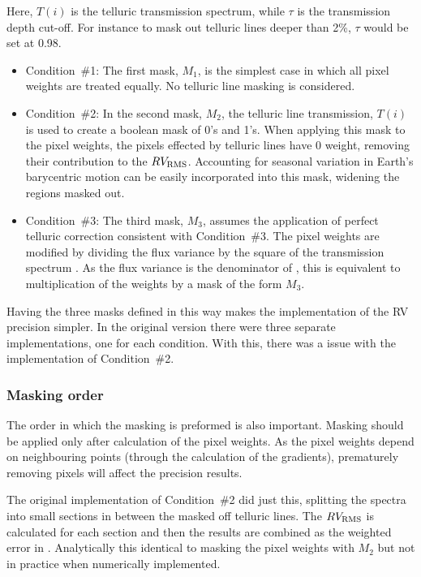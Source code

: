 Here, \(T(i)\) is the telluric transmission spectrum, while \(\tau\) is the transmission depth cut-off. For instance to mask out telluric lines deeper than 2\%,  \(\tau\) would be set at 0.98.

\begin{itemize}
    \item Condition~\#1:
    The first mask, \(M_1\), is the simplest case in which all pixel weights are treated equally. No telluric line masking is considered.

    \item Condition~\#2:
    In the second mask, \(M_2\), the telluric line transmission, \(T(i)\) is used to create a boolean mask of 0's and 1's. When applying this mask to the pixel weights, the pixels effected by telluric lines have 0 weight, removing their contribution to the {\red{} \(RV_{\textrm{RMS}}\)}. Accounting for seasonal variation in Earth's barycentric motion can be easily incorporated into this mask, widening the regions masked out.

    \item Condition~\#3:
    The third mask, \(M_3\), assumes the application of perfect telluric correction consistent with Condition~\#3. The pixel weights are modified by dividing the flux variance by the square of the transmission spectrum . As the flux variance is the denominator of , this is equivalent to multiplication of the weights by a mask of the form \(M_3\).
\end{itemize}

Having the three masks defined in this way makes the implementation of the {RV} precision simpler. In the original version there were three separate implementations, one for each condition. With this,  there was a issue with the implementation of Condition~\#2.

\subsubsection{Masking order}
\label{subsubsec:masking_order}
The order in which the masking is preformed is also important. Masking should be applied only after calculation of the pixel weights. As the pixel weights depend on neighbouring points (through the calculation of the gradients), prematurely removing pixels will affect the precision results.

The original implementation of Condition~\#2 did just this, splitting the spectra into small sections in between the masked off telluric lines. The {\red{}\(RV_{\textrm{RMS}}\)} is calculated for each section and then the results are combined as the weighted error in {\red{} } . Analytically this identical to masking the pixel weights with \(M_2\) but not in practice when numerically implemented. 

